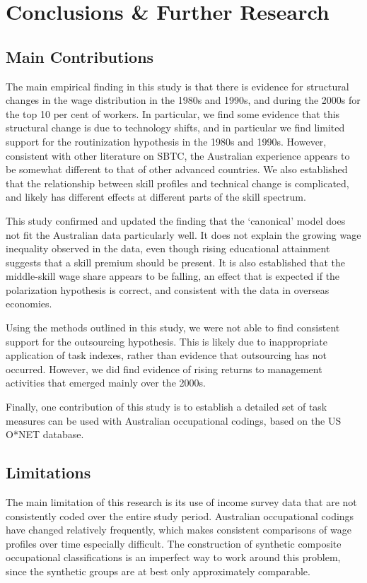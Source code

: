 \chapter{Conclusions \& Further Research}\label{ch:5}


\section{Main Contributions}

The main empirical finding in this study is that there is evidence for structural changes in the wage distribution in the 1980s and 1990s, and during the 2000s for the top 10 per cent of workers. In particular, we find some evidence that this structural change is due to technology shifts, and in particular we find limited support for the routinization hypothesis in the 1980s and 1990s. However, consistent with other literature on SBTC, the Australian experience appears to be somewhat different to that of other advanced countries. We also established that the relationship between skill profiles and technical change is complicated, and likely has different effects at different parts of the skill spectrum.

This study confirmed and updated the finding that the `canonical' model does not fit the Australian data particularly well. It does not explain the growing wage inequality observed in the data, even though rising educational attainment suggests that a skill premium should be present. It is also established that the middle-skill wage share appears to be falling, an effect that is expected if the polarization hypothesis is correct, and consistent with the data in overseas economies.

Using the methods outlined in this study, we were not able to find consistent support for the outsourcing hypothesis. This is likely due to inappropriate application of task indexes, rather than evidence that outsourcing has not occurred. However, we did find evidence of rising returns to management activities that emerged mainly over the 2000s.

Finally, one contribution of this study is to establish a detailed set of task measures can be used with Australian occupational codings, based on the US O*NET database.

\section{Limitations}

The main limitation of this research is its use of income survey data that are not consistently coded over the entire study period. Australian occupational codings have changed relatively frequently, which makes consistent comparisons of wage profiles over time especially difficult. The construction of synthetic composite occupational classifications is an imperfect way to work around this problem, since the synthetic groups are at best only approximately comparable.

